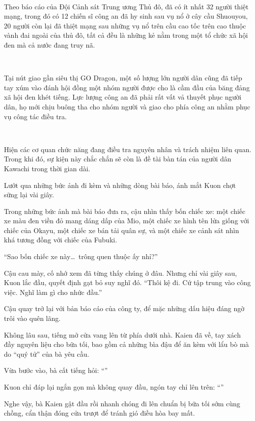 \documentclass[../main.tex]{subfiles}
\begin{document}
{    \

    Theo báo cáo của Đội Cảnh sát Trung ương Thủ đô, đã có ít nhất 32 người thiệt mạng, trong đó có 12 chiến sĩ công an đã hy sinh sau vụ nổ ở cây cầu Shuouyou, 20 người còn lại đã thiệt mạng sau những vụ nổ trên cầu cao tốc trên cao thuộc vành đai ngoài của thủ đô, tất cả đều là những kẻ nằm trong một tổ chức xã hội đen mà cả nước đang truy nã.

    \

    Tại nút giao gần siêu thị GO Dragon, một số lượng lớn người dân cũng đã tiếp tay xúm vào đánh hội đồng một nhóm người được cho là cầm đầu của băng đảng xã hội đen khét tiếng. Lực lượng công an đã phải rất vất vả thuyết phục người dân, họ mới chịu buông tha cho nhóm người và giao cho phía công an nhằm phục vụ công tác điều tra.

    \

    Hiện các cơ quan chức năng đang điều tra nguyên nhân và trách nhiệm liên quan. Trong khi đó, sự kiện này chắc chắn sẽ còn là đề tài bàn tán của người dân Kawachi trong thời gian dài.}

Lướt qua những bức ảnh đi kèm và những dòng bài báo, ánh mắt Kuon chợt sững lại vài giây.

Trong những bức ảnh mà bài báo đưa ra, cậu nhìn thấy bốn chiếc xe: một chiếc xe màu đen viền đỏ mang dáng dấp của Mio, một chiếc xe hình tên lửa giống với chiếc của Okayu, một chiếc xe bán tải quân sự, và một chiếc xe cảnh sát nhìn khá tương đồng với chiếc của Fubuki.

``Sao bốn chiếc xe này\dots\ trông quen thuộc ấy nhỉ?''

Cậu cau mày, cố nhớ xem đã từng thấy chúng ở đâu. Nhưng chỉ vài giây sau, Kuon lắc đầu, quyết định gạt bỏ suy nghĩ đó. ``Thôi kệ đi. Cứ tập trung vào công việc. Nghĩ làm gì cho nhức đầu.''

Cậu quay trở lại với bản báo cáo của công ty, để mặc những dấu hiệu đáng ngờ trôi vào quên lãng.

Không lâu sau, tiếng mở cửa vang lên từ phía dưới nhà. Kaien đã về, tay xách đầy nguyên liệu cho bữa tối, bao gồm cả những bìa đậu để ăn kèm với lẩu bò mà do ``quý tử'' của bà yêu cầu.

Vừa bước vào, bà cất tiếng hỏi: ``''

Kuon chỉ đáp lại ngắn gọn mà không quay đầu, ngón tay chỉ lên trên: ``''

Nghe vậy, bà Kaien gật đầu rồi nhanh chóng đi lên chuẩn bị bữa tối sớm cùng chồng, cẩn thận đóng cửa trượt để tránh gió điều hòa bay mất.
\end{document}
